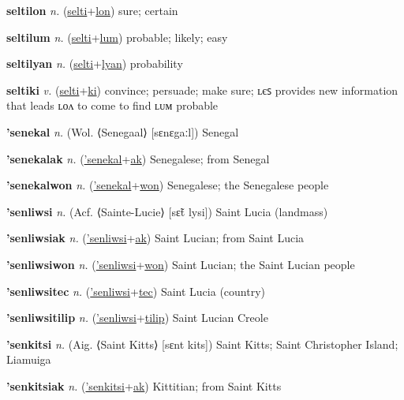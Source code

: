 \textbf{\hypertarget{seltilon}{seltilon}} \textit{n.} (\hyperlink{selti}{selti}+\allowbreak \hyperlink{lon}{lon})
sure; certain

\textbf{\hypertarget{seltilum}{seltilum}} \textit{n.} (\hyperlink{selti}{selti}+\allowbreak \hyperlink{lum}{lum})
probable; likely; easy

\textbf{\hypertarget{seltilyan}{seltilyan}} \textit{n.} (\hyperlink{selti}{selti}+\allowbreak \hyperlink{lyan}{lyan})
probability

\textbf{\hypertarget{seltiki}{seltiki}} \textit{v.} (\hyperlink{selti}{selti}+\allowbreak \hyperlink{ki}{ki})
convince; persuade; make sure; ʟєꜱ provides new information that leads ʟᴏᴧ to come to find ʟᴜᴍ probable

\textbf{\hypertarget{'senekal}{'senekal}} \textit{n.} (Wol. ⟨Senegaal⟩ [sɛnɛgaːl])
Senegal

\textbf{\hypertarget{'senekalak}{'senekalak}} \textit{n.} (\hyperlink{'senekal}{'senekal}+\allowbreak \hyperlink{ak}{ak})
Senegalese; from Senegal

\textbf{\hypertarget{'senekalwon}{'senekalwon}} \textit{n.} (\hyperlink{'senekal}{'senekal}+\allowbreak \hyperlink{won}{won})
Senegalese; the Senegalese people

\textbf{\hypertarget{'senliwsi}{'senliwsi}} \textit{n.} (Acf. ⟨Sainte-Lucie⟩ [sɛ̃t lysi])
Saint Lucia (landmass)

\textbf{\hypertarget{'senliwsiak}{'senliwsiak}} \textit{n.} (\hyperlink{'senliwsi}{'senliwsi}+\allowbreak \hyperlink{ak}{ak})
Saint Lucian; from Saint Lucia

\textbf{\hypertarget{'senliwsiwon}{'senliwsiwon}} \textit{n.} (\hyperlink{'senliwsi}{'senliwsi}+\allowbreak \hyperlink{won}{won})
Saint Lucian; the Saint Lucian people

\textbf{\hypertarget{'senliwsitec}{'senliwsitec}} \textit{n.} (\hyperlink{'senliwsi}{'senliwsi}+\allowbreak \hyperlink{tec}{tec})
Saint Lucia (country)

\textbf{\hypertarget{'senliwsitilip}{'senliwsitilip}} \textit{n.} (\hyperlink{'senliwsi}{'senliwsi}+\allowbreak \hyperlink{tilip}{tilip})
Saint Lucian Creole

\textbf{\hypertarget{'senkitsi}{'senkitsi}} \textit{n.} (Aig. ⟨Saint Kitts⟩ [sɛnt kits])
Saint Kitts; Saint Christopher Island; Liamuiga

\textbf{\hypertarget{'senkitsiak}{'senkitsiak}} \textit{n.} (\hyperlink{'senkitsi}{'senkitsi}+\allowbreak \hyperlink{ak}{ak})
Kittitian; from Saint Kitts

